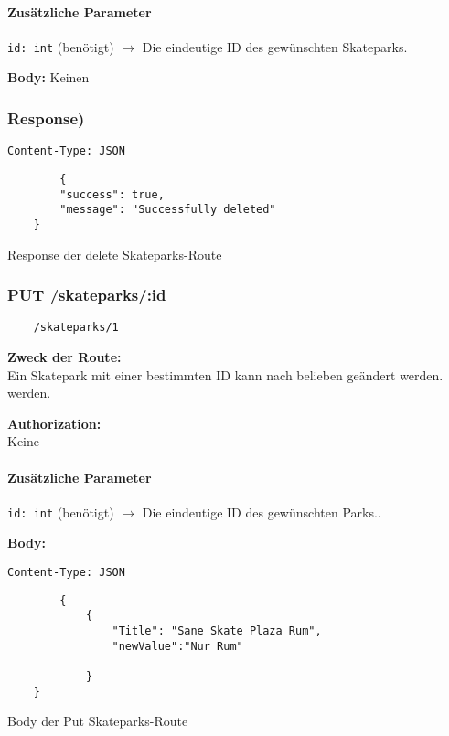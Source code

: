 \paragraph{Zusätzliche Parameter}
\lstinline{id: int} (benötigt)
$\rightarrow$ Die eindeutige ID des gewünschten Skateparks.

\textbf{Body:}
Keinen


\subsubsection{Response)}
\begin{code}
    \lstinline{Content-Type: JSON}
    \begin{lstlisting}
        {
        "success": true,
        "message": "Successfully deleted"
    }
    \end{lstlisting}
    \caption{Response der delete Skateparks-Route }
\end{code}

\pagebreak


\subsubsection{PUT /skateparks/:id}

\begin{lstlisting}
    /skateparks/1
\end{lstlisting}

\textbf{Zweck der Route:} \\
Ein Skatepark mit einer bestimmten ID kann nach belieben geändert werden.
werden.

\textbf{Authorization:} \\
Keine

\paragraph{Zusätzliche Parameter}
\lstinline{id: int} (benötigt)
$\rightarrow$ Die eindeutige ID des gewünschten Parks..

\textbf{Body:}\\
\begin{code}
    \lstinline{Content-Type: JSON}
    \begin{lstlisting}
        {
            {
                "Title": "Sane Skate Plaza Rum",
                "newValue":"Nur Rum"
    
            }
    }
    \end{lstlisting}
    \caption{Body der Put Skateparks-Route}
\end{code}

